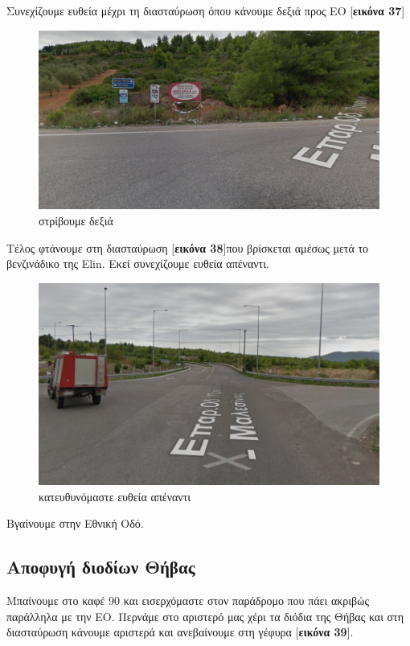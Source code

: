 Συνεχίζουμε ευθεία μέχρι τη διασταύρωση όπου κάνουμε δεξιά προς ΕΟ [\textbf{εικόνα 37}]
\begin{figure}[H]
\includegraphics[width=\textwidth]{images/lamia-athina/tragana/tragana_013.jpg} 
\caption{στρίβουμε δεξιά}
\end{figure}
Τέλος φτάνουμε στη διασταύρωση [\textbf{εικόνα 38}]που βρίσκεται αμέσως μετά το βενζινάδικο της Elin. Εκεί συνεχίζουμε ευθεία απέναντι.
\begin{figure}[H]
\includegraphics[width=\textwidth]{images/lamia-athina/tragana/tragana_014.jpg} 
\caption{κατευθυνόμαστε ευθεία απέναντι}
\end{figure}
Βγαίνουμε στην Εθνική Οδό.
\newpage
\begin{center}
\section*{Αποφυγή διοδίων Θήβας}
\end{center}
Μπαίνουμε στο καφέ 90 και εισερχόμαστε στον παράδρομο που πάει ακριβώς παράλληλα με την ΕΟ. Περνάμε στο αριστερό μας χέρι τα διόδια της Θήβας και στη διασταύρωση κάνουμε αριστερά και ανεβαίνουμε στη γέφυρα [\textbf{εικόνα 39}]. 
